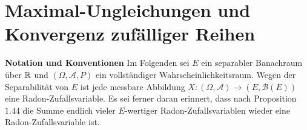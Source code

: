 \chapter{Maximal-Ungleichungen und Konvergenz zufälliger Reihen}
\textbf{Notation und Konventionen}\newline 
Im Folgenden sei $E$ ein separabler Banachraum über $\mathbb{R}$ und $(\Omega, \mathcal{A}, P)$ ein vollständiger Wahrscheinlichkeitsraum. Wegen der Separabilität von $E$ ist jede messbare Abbildung $X: (\Omega, \mathcal{A}) \to (E, \mathcal{B}(E))$ eine Radon-Zufallsvariable. 
Es sei ferner daran erinnert, dass nach Proposition $1.44$ die Summe endlich vieler $E$-wertiger Radon-Zufallsvariablen wieder eine Radon-Zufallsvariable ist. 




